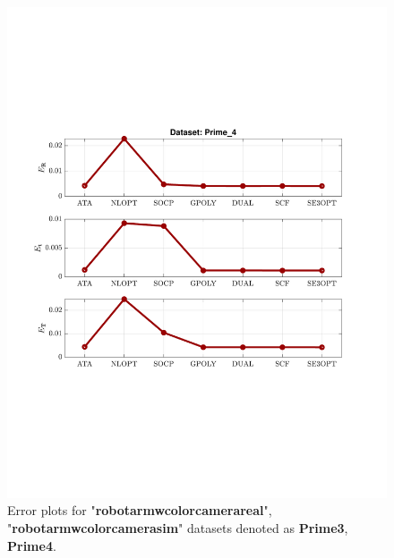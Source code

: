 \documentclass[a4paper]{report}
\begin{document}
\begin{figure}
\includegraphics[scale=0.7]{./hand_eye_figures/real/adv_Result_Prime_4}
\caption{Error plots for "\textbf{robot{\textunderscore}arm{\textunderscore}w{\textunderscore}color{\textunderscore}camera{\textunderscore}real}", "\textbf{robot{\textunderscore}arm{\textunderscore}w{\textunderscore}color{\textunderscore}camera{\textunderscore}sim}" datasets denoted as \textbf{Prime{\textunderscore}3}, \textbf{Prime{\textunderscore}4}.}
\end{figure}
\end{document}
